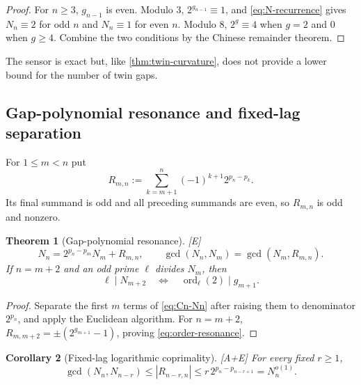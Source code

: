 \documentclass[11pt]{article}
\newtheorem{theorem}{Theorem}[section]
\newtheorem{corollary}[theorem]{Corollary}
\theoremstyle{definition}
\theoremstyle{remark}
\newcommand{\status}[1]{\textnormal{\textcolor{accent}{\footnotesize[#1]}}}
\DeclareMathOperator{\ord}{ord}
\begin{document}
\begin{proof}
For $n\ge3$, $g_{n-1}$ is even.  Modulo $3$, $2^{g_{n-1}}\equiv1$, and
\eqref{eq:N-recurrence} gives $N_n\equiv2$ for odd $n$ and $N_n\equiv1$ for even
$n$.  Modulo $8$, $2^g\equiv4$ when $g=2$ and $0$ when $g\ge4$.  Combine the two
conditions by the Chinese remainder theorem.
\end{proof}

The sensor is exact but, like \cref{thm:twin-curvature}, does not provide a lower bound
for the number of twin gaps.

\subsection{Gap-polynomial resonance and fixed-lag separation}

For $1\le m<n$ put
\begin{equation}\label{eq:Rmn}
 R_{m,n}:=\sum_{k=m+1}^{n}(-1)^{k+1}2^{p_n-p_k}.
\end{equation}
Its final summand is odd and all preceding summands are even, so $R_{m,n}$ is odd and
nonzero.

\begin{theorem}[Gap-polynomial resonance]\label{thm:gcd-resonance}
\status{E}
\begin{equation}\label{eq:gcd-resonance}
 N_n=2^{p_n-p_m}N_m+R_{m,n},\qquad
 \gcd(N_n,N_m)=\gcd(N_m,R_{m,n}).
\end{equation}
If $n=m+2$ and an odd prime $\ell$ divides $N_m$, then
\begin{equation}\label{eq:order-resonance}
 \ell\mid N_{m+2}\quad\Longleftrightarrow\quad
 \ord_\ell(2)\mid g_{m+1}.
\end{equation}
\end{theorem}

\begin{proof}
Separate the first $m$ terms of \eqref{eq:Cn-Nn} after raising them to denominator
$2^{p_n}$, and apply the Euclidean algorithm.  For $n=m+2$,
$R_{m,m+2}=\pm(2^{g_{m+1}}-1)$, proving \eqref{eq:order-resonance}.
\end{proof}

\begin{corollary}[Fixed-lag logarithmic coprimality]\label{cor:fixed-lag-gcd}
\status{A+E}
For every fixed $r\ge1$,
\begin{equation}\label{eq:fixed-lag-gcd}
 \gcd(N_n,N_{n-r})
 \le |R_{n-r,n}|
 \le r\,2^{p_n-p_{n-r+1}}
 =N_n^{o(1)}.
\end{equation}
\end{corollary}
\end{document}
